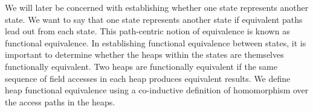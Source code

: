 %
%
%

We will later be concerned with establishing whether one state represents another state. We want to say that one state represents another state if equivalent paths lead out from each state. This path-centric notion of equivalence is known as functional equivalence. In establishing functional equivalence between states, it is important to determine whether the heaps within the states are themselves functionally equivalent. Two heaps are functionally equivalent if the same sequence of field accesses in each heap produces equivalent results. We define heap functional equivalence using a co-inductive definition of homomorphism over the access paths in the heaps.

